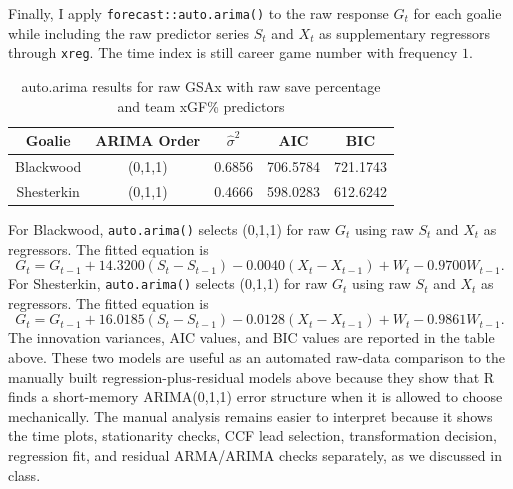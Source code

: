 \documentclass[
  10pt,
]{extarticle}
\begin{document}
Finally, I apply \texttt{forecast::auto.arima()} to the raw response \(G_t\) for each goalie while including the raw predictor series \(S_t\) and \(X_t\) as supplementary regressors through \texttt{xreg}. The time index is still career game number with frequency \(1\).

\begin{center}
\small
\begin{table}[H]

\caption{\label{tab:p2-auto-table}auto.arima results for raw GSAx with raw save percentage and team xGF\% predictors}
\centering
\begin{tabular}[t]{ccccc}
\toprule
Goalie & ARIMA Order & $\hat{\sigma}^2$ & AIC & BIC\\
\midrule
Blackwood & (0,1,1) & 0.6856 & 706.5784 & 721.1743\\
Shesterkin & (0,1,1) & 0.4666 & 598.0283 & 612.6242\\
\bottomrule
\end{tabular}
\end{table}
\normalsize
\end{center}

For Blackwood, \texttt{auto.arima()} selects (0,1,1) for raw \(G_t\) using raw \(S_t\) and \(X_t\) as regressors. The fitted equation is
\[
G_t=G_{t-1}+14.3200(S_t-S_{t-1})-0.0040(X_t-X_{t-1})+W_t-0.9700W_{t-1}.
\]
For Shesterkin, \texttt{auto.arima()} selects (0,1,1) for raw \(G_t\) using raw \(S_t\) and \(X_t\) as regressors. The fitted equation is
\[
G_t=G_{t-1}+16.0185(S_t-S_{t-1})-0.0128(X_t-X_{t-1})+W_t-0.9861W_{t-1}.
\]
The innovation variances, AIC values, and BIC values are reported in the table above. These two models are useful as an automated raw-data comparison to the manually built regression-plus-residual models above because they show that R finds a short-memory ARIMA(0,1,1) error structure when it is allowed to choose mechanically. The manual analysis remains easier to interpret because it shows the time plots, stationarity checks, CCF lead selection, transformation decision, regression fit, and residual ARMA/ARIMA checks separately, as we discussed in class.
\end{document}
